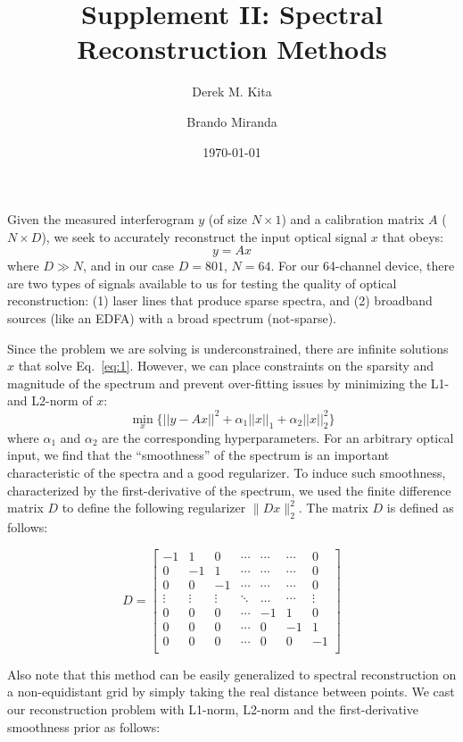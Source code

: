 \documentclass[10pt,a4paper]{article}
\title{Supplement II: Spectral Reconstruction Methods}
\author[1]{Derek M. Kita}
\author[2]{Brando Miranda}
\affil[1]{Department of Materials Science \& Engineering, Massachusetts Institute of Technology}
\affil[2]{Center for Brains, Minds, and Machines, Massachusetts Institute of Technology}
\date{\today}
\begin{document}
\maketitle

Given the measured interferogram $y$ (of size $N\times 1$) and a calibration matrix $A$ ($N\times D$), we seek to accurately reconstruct the input optical signal $x$ that obeys:
\begin{equation}
y = Ax \label{eq:1}
\end{equation}
where $D\gg N$, and in our case $D=801$, $N=64$.  For our 64-channel device, there are two types of signals available to us for testing the quality of optical reconstruction: (1) laser lines that produce sparse spectra, and (2) broadband sources (like an EDFA) with a broad spectrum (not-sparse).

Since the problem we are solving is underconstrained, there are infinite solutions $x$ that solve Eq.~\ref{eq:1}. However, we can place constraints on the sparsity and magnitude of the spectrum and prevent over-fitting issues by minimizing the L1- and L2-norm of $x$:
\begin{equation}
\min_x \Big\{ ||y-Ax||^2 + \alpha_1 ||x||_1 + \alpha_2 ||x||_2^2 \Big\}
\end{equation}
where $\alpha_1$ and $\alpha_2$ are the corresponding hyperparameters.  For an arbitrary optical input, we find that the ``smoothness'' of the spectrum is an important characteristic of the spectra and a good regularizer.  To induce such smoothness, characterized by the first-derivative of the spectrum, we used the finite difference matrix $D$ to define the following regularizer $\| D x\|^2_2$.  The matrix $D$ is defined as follows:

\[
   D=
  \left[ {\begin{array}{ccccccc}
   -1 & 1 & 0 &  \cdots & \cdots & \cdots & 0\\
   0 & -1 & 1 &  \cdots & \cdots & \cdots & 0\\
   0 & 0 & -1 &  \cdots & \cdots & \cdots & 0\\
   \vdots & \vdots & \vdots &  \ddots & \dots & \cdots & \vdots\\
   0 & 0 & 0 &  \cdots & -1 & 1 & 0\\
   0 & 0 & 0 &  \cdots & 0 & -1 & 1\\
   0 & 0 & 0 &  \cdots & 0 & 0 & -1\\
  \end{array} } \right]
\]

Also note that this method can be easily generalized to spectral reconstruction on a non-equidistant grid by simply taking the real distance between points. We cast our reconstruction problem with L1-norm, L2-norm and the first-derivative smoothness prior as follows:
\end{document}
